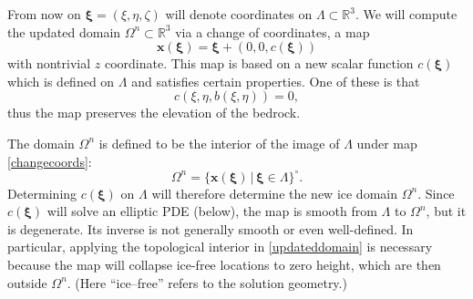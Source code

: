 \documentclass[letterpaper,final,12pt,reqno]{amsart}
\newcommand{\RR}{\mathbb{R}}
\newcommand{\bx}{\mathbf{x}}
\newcommand{\bxi}{\bm{\xi}}
\begin{document}
From now on $\bxi=(\xi,\eta,\zeta)$ will denote coordinates on $\Lambda \subset \RR^3$.  We will compute the updated domain $\Omega^n \subset \RR^3$ via a change of coordinates, a map
\begin{equation}
\bx(\bxi) = \bxi + (0,0,c(\bxi)) \label{changecoords}
\end{equation}
with nontrivial $z$ coordinate.  This map is based on a new scalar function $c(\bxi)$ which is defined on $\Lambda$ and satisfies certain properties.  One of these is that
\begin{equation}
c(\xi,\eta,b(\xi,\eta))=0, \label{mapbasetobase}
\end{equation}
thus the map preserves the elevation of the bedrock.

The domain $\Omega^n$ is defined to be the interior of the image of $\Lambda$ under map \eqref{changecoords}:
\begin{equation}
\Omega^n = \{\bx(\bxi) \,\big|\, \bxi \in \Lambda\}^\circ. \label{updateddomain}
\end{equation}
Determining $c(\bxi)$ on $\Lambda$ will therefore determine the new ice domain $\Omega^n$.  Since $c(\bxi)$ will solve an elliptic PDE (below), the map is smooth from $\Lambda$ to $\Omega^n$, but it is degenerate.  Its inverse is not generally smooth or even well-defined.  In particular, applying the topological interior in \eqref{updateddomain} is necessary because the map will collapse ice-free locations to zero height, which are then outside $\Omega^n$.  (Here ``ice--free'' refers to the solution geometry.)
\end{document}
